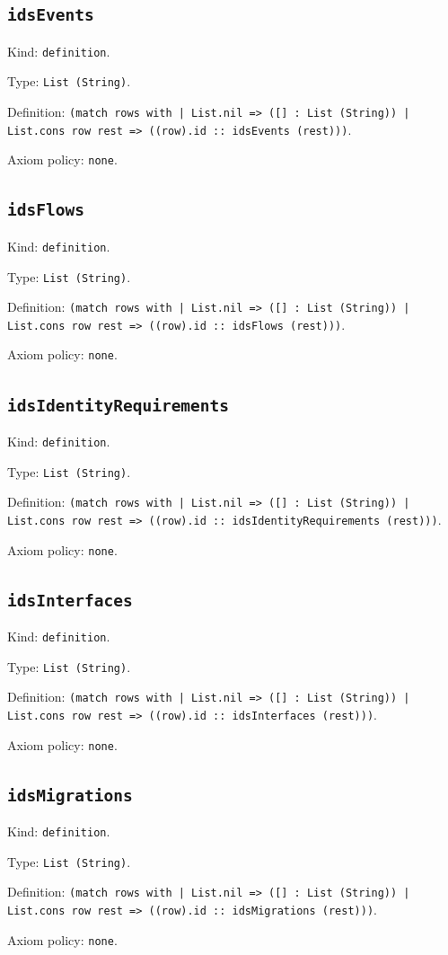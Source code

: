 \documentclass[11pt]{article}
\begin{document}
\subsection*{\texttt{idsEvents}}
\noindent Kind: \texttt{definition}.\par
\noindent Type: \texttt{List (String)}.\par
\noindent Definition: \texttt{(match rows with | List.nil => ([] : List (String)) | List.cons row rest => ((row).id :: idsEvents (rest)))}.\par
\noindent Axiom policy: \texttt{none}.\par
\subsection*{\texttt{idsFlows}}
\noindent Kind: \texttt{definition}.\par
\noindent Type: \texttt{List (String)}.\par
\noindent Definition: \texttt{(match rows with | List.nil => ([] : List (String)) | List.cons row rest => ((row).id :: idsFlows (rest)))}.\par
\noindent Axiom policy: \texttt{none}.\par
\subsection*{\texttt{idsIdentityRequirements}}
\noindent Kind: \texttt{definition}.\par
\noindent Type: \texttt{List (String)}.\par
\noindent Definition: \texttt{(match rows with | List.nil => ([] : List (String)) | List.cons row rest => ((row).id :: idsIdentityRequirements (rest)))}.\par
\noindent Axiom policy: \texttt{none}.\par
\subsection*{\texttt{idsInterfaces}}
\noindent Kind: \texttt{definition}.\par
\noindent Type: \texttt{List (String)}.\par
\noindent Definition: \texttt{(match rows with | List.nil => ([] : List (String)) | List.cons row rest => ((row).id :: idsInterfaces (rest)))}.\par
\noindent Axiom policy: \texttt{none}.\par
\subsection*{\texttt{idsMigrations}}
\noindent Kind: \texttt{definition}.\par
\noindent Type: \texttt{List (String)}.\par
\noindent Definition: \texttt{(match rows with | List.nil => ([] : List (String)) | List.cons row rest => ((row).id :: idsMigrations (rest)))}.\par
\noindent Axiom policy: \texttt{none}.\par
\end{document}
